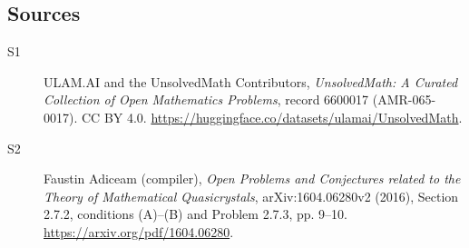 \documentclass[11pt]{article}
\begin{document}
\subsection{Sources}
\begin{description}
\item[\hypertarget{source:6600017:1}{S1}] ULAM.AI and the UnsolvedMath Contributors, \emph{UnsolvedMath: A Curated Collection of Open Mathematics Problems}, record 6600017 (AMR-065-0017). CC BY 4.0. \url{https://huggingface.co/datasets/ulamai/UnsolvedMath}.
\item[\hypertarget{source:6600017:2}{S2}] Faustin Adiceam (compiler), \emph{Open Problems and Conjectures related to the Theory of Mathematical Quasicrystals}, arXiv:1604.06280v2 (2016), Section 2.7.2, conditions (A)--(B) and Problem 2.7.3, pp. 9--10. \url{https://arxiv.org/pdf/1604.06280}.
\end{description}
\label{end:6600017}
\end{document}
